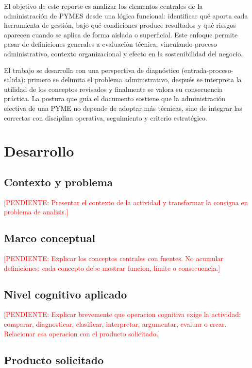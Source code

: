 \documentclass[
	spanish,
	letterpaper, oneside
]{article}
\newcommand{\pendiente}[1]{\textcolor{red}{[PENDIENTE: #1]}}
\begin{document}
El objetivo de este reporte es analizar los elementos centrales de la administración de PYMES desde una lógica funcional: identificar qué aporta cada herramienta de gestión, bajo qué condiciones produce resultados y qué riesgos aparecen cuando se aplica de forma aislada o superficial. Este enfoque permite pasar de definiciones generales a evaluación técnica, vinculando proceso administrativo, contexto organizacional y efecto en la sostenibilidad del negocio.

El trabajo se desarrolla con una perspectiva de diagnóstico (entrada-proceso-salida): primero se delimita el problema administrativo, después se interpreta la utilidad de los conceptos revisados y finalmente se valora su consecuencia práctica. La postura que guía el documento sostiene que la administración efectiva de una PYME no depende de adoptar más técnicas, sino de integrar las correctas con disciplina operativa, seguimiento y criterio estratégico.

\section{Desarrollo}

\subsection{Contexto y problema}

\pendiente{Presentar el contexto de la actividad y transformar la consigna en problema de analisis.}

\subsection{Marco conceptual}

\pendiente{Explicar los conceptos centrales con fuentes. No acumular definiciones: cada concepto debe mostrar funcion, limite o consecuencia.}

\subsection{Nivel cognitivo aplicado}

\pendiente{Explicar brevemente que operacion cognitiva exige la actividad: comparar, diagnosticar, clasificar, interpretar, argumentar, evaluar o crear. Relacionar esa operacion con el producto solicitado.}

\subsection{Producto solicitado}
\end{document}
